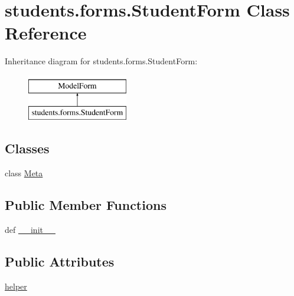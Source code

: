 \hypertarget{classstudents_1_1forms_1_1_student_form}{\section{students.\-forms.\-Student\-Form Class Reference}
\label{classstudents_1_1forms_1_1_student_form}
}
Inheritance diagram for students.\-forms.\-Student\-Form\-:\begin{figure}[H]
\begin{center}
\leavevmode
\includegraphics[height=2.000000cm]{classstudents_1_1forms_1_1_student_form}
\end{center}
\end{figure}
\subsection*{Classes}
\begin{DoxyCompactItemize}
\item 
class \hyperlink{classstudents_1_1forms_1_1_student_form_1_1_meta}{Meta}
\end{DoxyCompactItemize}
\subsection*{Public Member Functions}
\begin{DoxyCompactItemize}
\item 
def \hyperlink{classstudents_1_1forms_1_1_student_form_a2cfb0cfcdd792efec48f8936f8289365}{\-\_\-\-\_\-init\-\_\-\-\_\-}
\end{DoxyCompactItemize}
\subsection*{Public Attributes}
\begin{DoxyCompactItemize}
\item 
\hyperlink{classstudents_1_1forms_1_1_student_form_a4a28a9682e6d190c1957fb9fb29fdb0e}{helper}
\end{DoxyCompactItemize}


